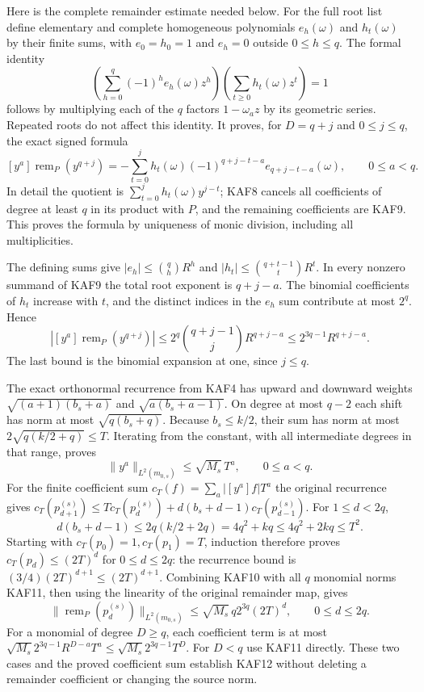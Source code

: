 \documentclass[11pt,a4paper]{article}
\begin{document}
Here is the complete remainder estimate needed below. For the full
root list define elementary and complete homogeneous polynomials
$e_h(\omega)$ and $h_t(\omega)$ by their finite sums, with
$e_0=h_0=1$ and $e_h=0$ outside $0\le h\le q$. The formal identity
\[
 \left(\sum_{h=0}^q(-1)^he_h(\omega)z^h\right)
 \left(\sum_{t\ge0}h_t(\omega)z^t\right)=1
 \tag{KAF8}
\]
follows by multiplying each of the $q$ factors $1-\omega_a z$
by its geometric series. Repeated roots do not affect this identity.
It proves, for $D=q+j$ and $0\le j\le q$, the exact signed formula
\[
 [y^a]\operatorname{rem}_P(y^{q+j})
 =-\sum_{t=0}^j h_t(\omega)(-1)^{q+j-t-a}e_{q+j-t-a}(\omega),
 \qquad0\le a<q.\tag{KAF9}
\]
In detail the quotient is $\sum_{t=0}^jh_t(\omega)y^{j-t}$;
KAF8 cancels all coefficients of degree at least $q$ in its product
with $P$, and the remaining coefficients are KAF9. This proves the
formula by uniqueness of monic division, including all multiplicities.

The defining sums give
$|e_h|\le\binom qh R^h$ and
$|h_t|\le\binom{q+t-1}{t}R^t$. In every nonzero summand of KAF9
the total root exponent is $q+j-a$. The binomial coefficients of
$h_t$ increase with $t$, and the distinct indices in the $e_h$ sum
contribute at most $2^q$. Hence
\[
 |[y^a]\operatorname{rem}_P(y^{q+j})|
 \le2^q\binom{q+j-1}{j}R^{q+j-a}
 \le2^{3q-1}R^{q+j-a}.\tag{KAF10}
\]
The last bound is the binomial expansion at one, since $j\le q$.

The exact orthonormal recurrence from KAF4 has upward and downward
weights $\sqrt{(a+1)(b_s+a)}$ and $\sqrt{a(b_s+a-1)}$.
On degree at most $q-2$ each shift has norm at most
$\sqrt{q(b_s+q)}$. Because $b_s\le k/2$, their sum has norm at
most $2\sqrt{q(k/2+q)}\le T$. Iterating from the constant, with all
intermediate degrees in that range, proves
\[
 \|y^a\|_{L^2(m_{0,s})}\le\sqrt{M_s}\,T^a,
 \qquad0\le a<q.\tag{KAF11}
\]
For the finite coefficient sum $c_T(f)=\sum_a|[y^a]f|T^a$ the
original recurrence gives
$c_T(p_{d+1}^{(s)})\le T c_T(p_d^{(s)})+
d(b_s+d-1)c_T(p_{d-1}^{(s)})$.
For $1\le d<2q$,
\[
 d(b_s+d-1)\le2q(k/2+2q)=4q^2+kq
       \le4q^2+2kq\le T^2.
\]
Starting with $c_T(p_0)=1,c_T(p_1)=T$, induction therefore proves
$c_T(p_d)\le(2T)^d$ for $0\le d\le2q$: the recurrence bound is
$(3/4)(2T)^{d+1}\le(2T)^{d+1}$.
Combining KAF10 with all $q$ monomial norms KAF11, then using the
linearity of the original remainder map, gives
\[
 \|\operatorname{rem}_P(p_d^{(s)})\|_{L^2(m_{0,s})}
       \le\sqrt{M_s}\,q2^{3q}(2T)^d,
       \qquad0\le d\le2q.\tag{KAF12}
\]
For a monomial of degree $D\ge q$, each coefficient term is at
most $\sqrt{M_s}2^{3q-1}R^{D-a}T^a\le
\sqrt{M_s}2^{3q-1}T^D$. For $D<q$ use KAF11 directly.
These two cases and the proved coefficient sum establish KAF12
without deleting a remainder coefficient or changing the source norm.
\end{document}

